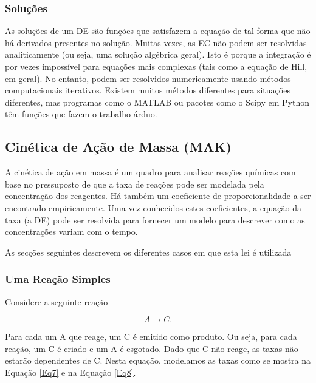 \documentclass[11pt, letterpaper, portuguese]{article}
\begin{document}
    \subsubsection{Soluções}
    
    \par{As soluções de um DE são funções que satisfazem a equação de tal forma que não há derivados presentes no solução. Muitas vezes, as EC não podem ser resolvidas analiticamente (ou seja, uma solução algébrica geral). Isto é porque a integração é por vezes impossível para equações mais complexas (tais como a equação de Hill, em geral). No entanto, podem ser resolvidos numericamente usando métodos computacionais iterativos. Existem muitos métodos diferentes para situações diferentes, mas programas como o MATLAB ou pacotes como o Scipy em Python têm funções que fazem o trabalho árduo.}

    \subsection{Cinética de Ação de Massa (MAK)}
    
    \par{A cinética de ação em massa é um quadro para analisar reações químicas com base no pressuposto de que a taxa de reações pode ser modelada pela concentração dos reagentes. Há também um coeficiente de proporcionalidade a ser encontrado empiricamente. Uma vez conhecidos estes coeficientes, a equação da taxa (a DE) pode ser resolvida para fornecer um modelo para descrever como as concentrações variam com o tempo.}
    \par{As secções seguintes descrevem os diferentes casos em que esta lei é utilizada
}
    
    \subsubsection{Uma Reação Simples}

    \par{Considere a seguinte reação}

    \begin{equation}
        A \rightarrow C.
    \end{equation}

    \par{Para cada um A que reage, um C é emitido como produto. Ou seja, para cada reação, um C é criado e um A é esgotado. Dado que C não reage, as taxas não estarão dependentes de C. Nesta equação, modelamos as taxas como se mostra na Equação \ref{Eq7} e na Equação \ref{Eq8}.}
\end{document}
